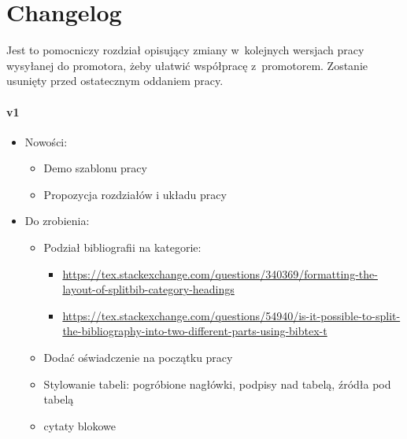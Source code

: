 \chapter*{Changelog}\label{ch:changelog}

Jest to pomocniczy rozdział opisujący zmiany w~kolejnych wersjach pracy wysyłanej do promotora, żeby ułatwić współpracę z~promotorem.
Zostanie usunięty przed ostatecznym oddaniem pracy.

\subsubsection{v1}
\begin{itemize}
    \item Nowości:
    \begin{itemize}
        \item Demo szablonu pracy
        \item Propozycja rozdziałów i układu pracy
    \end{itemize}
    \item Do zrobienia:
    \begin{itemize}
        \item Podział bibliografii na kategorie:
        \begin{itemize}
            \item \url{https://tex.stackexchange.com/questions/340369/formatting-the-layout-of-splitbib-category-headings}
            \item \url{https://tex.stackexchange.com/questions/54940/is-it-possible-to-split-the-bibliography-into-two-different-parts-using-bibtex-t}
        \end{itemize}
        \item Dodać oświadczenie na początku pracy
        \item Stylowanie tabeli: pogróbione nagłówki, podpisy nad tabelą, źródła pod tabelą
        \item cytaty blokowe
    \end{itemize}
\end{itemize}

\cleardoublepage
{}
